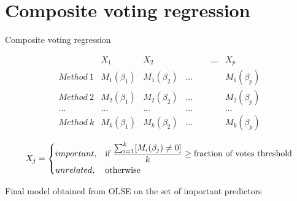 \documentclass{beamer}
\begin{document}
\section{Composite voting regression}
\begin{frame}{Composite voting regression}

{\def\arraystretch{1.5}\tabcolsep=10pt
	\begin{equation*}
	\begin{array}{l|rrrr} 
	& X_1 & X_2 & \quad\quad\quad... & X_p \\
	\hline	
	Method\ 1 & M_1(\beta_1) & M_1(\beta_2) & ... & M_1(\beta_p) \\
	Method\ 2 & M_2(\beta_1) & M_2(\beta_2) & ... & M_2(\beta_p) \\
	... & ... & ... & ... & ... \\
	Method\ k & M_k(\beta_1) & M_k(\beta_2) & ... & M_k(\beta_p)
	\end{array}
	\end{equation*}
}

\begin{equation*}
X_j = 
\begin{dcases}
important,& \text{if } \frac{\sum_{i=1}^{k}[M_i(\beta_j) \ne 0]}{k} \ge \text{fraction of votes threshold}\\
unrelated,              & \text{otherwise}
\end{dcases}
\end{equation*}

Final model obtained from OLSE on the set of important predictors
\end{frame}
\end{document}
